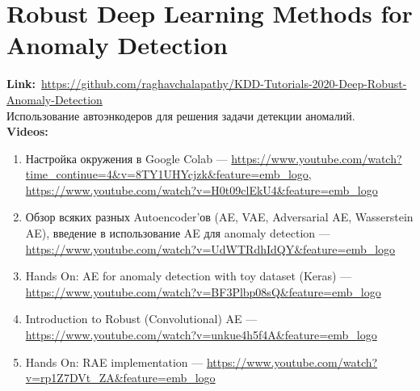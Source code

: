 \section*{Robust Deep Learning Methods for Anomaly Detection} 

\textbf{Link:}~\url{https://github.com/raghavchalapathy/KDD-Tutorials-2020-Deep-Robust-Anomaly-Detection} \\

Использование автоэнкодеров для решения задачи детекции аномалий. \\

\textbf{Videos:}

\begin{enumerate}
    \item Настройка окружения в Google Colab --- \url{https://www.youtube.com/watch?time_continue=4&v=8TY1UHYcjzk&feature=emb_logo}, \url{https://www.youtube.com/watch?v=H0t09clEkU4&feature=emb_logo}
    \item Обзор всяких разных Autoencoder'ов (AE, VAE, Adversarial AE, Wasserstein AE), введение в использование AE для anomaly detection --- \url{https://www.youtube.com/watch?v=UdWTRdhIdQY&feature=emb_logo}
    \item Hands On: AE for anomaly detection with toy dataset (Keras) --- \url{https://www.youtube.com/watch?v=BF3Plbp08sQ&feature=emb_logo}
    \item Introduction to Robust (Convolutional) AE --- \url{https://www.youtube.com/watch?v=unkue4h5f4A&feature=emb_logo}
    \item Hands On: RAE implementation --- \url{https://www.youtube.com/watch?v=rp1Z7DVt_ZA&feature=emb_logo}
\end{enumerate}
